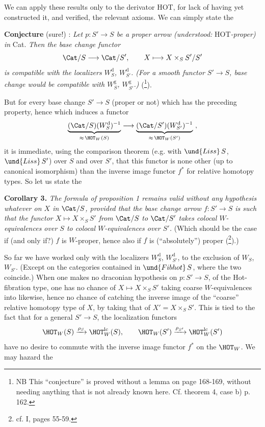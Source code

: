 We can apply these results only to the derivator
HOT, for lack of having yet constructed it, and verified, the relevant axioms. We can simply state %
the

\textbf{Conjecture} (sure!) : \textit{Let $p : S' \longrightarrow S$ be a proper arrow (understood:} HOT\textit{-proper) in} Cat. \textit{Then the base change functor}
\[
\Cat/S \longrightarrow \Cat/S', \qquad X \longmapsto X \times_S S'/S'
\]
\textit{is compatible with the localizers $W_S^{\mathrm{d}}$, $W_{S'}^{\mathrm{d}}$. (For a smooth functor $S' \longrightarrow S$, base change would be compatible with $W_S^{\mathrm{g}}$, $W_{S'}^{\mathrm{g}}$.)} (\footnote[61]{NB This ``conjecture'' is proved without a lemma on page 168-169, without needing anything that is not %
already known here. Cf. theorem 4, case b) p. 162.}).

But for every base change $S' \longrightarrow S$ (proper or not) which has the preceding property, %
hence which induces a functor
\[
\underbrace{(\Cat/S)(W_S^{\mathrm{d}})^{-1}}_{\approx\,\HOT_W(S)} \longrightarrow \underbrace{(\Cat/S')(W_{S'}^{\mathrm{d}})^{-1}}_{\approx\,\HOT_W(S')}\ ,
\]
it is immediate, using the comparison theorem (e.g. with $\und{Liss}\,S$, $\und{Liss}\,S'$) over $S$ and over $S'$, that this functor is none other (up to canonical isomorphism) than the inverse image functor $f^*$ for relative homotopy types. So let us state the %

\textbf{Corollary 3.} \textit{The formula of proposition 1 remains valid without any hypothesis whatever on $X$ in} $\Cat/S$\textit{, provided that the base change arrow $f : S' \longrightarrow S$ is such that the functor $X \longmapsto X \times_S S'$ from} $\Cat/S$ \textit{to} $\Cat/S'$
\textit{takes colocal $W$-equivalences over $S$ to colocal $W$-equivalences over $S'$.} (Which should be the case if (and only if?) $f$ is $W$-proper, hence also if $f$ is (``absolutely'') proper (\footnote[62]{cf. I, pages 55-59.}).)

So far we have worked only with the localizers $W_S^{\mathrm{d}}$, $W_{S'}^{\mathrm{d}}$, to the exclusion of $W_S$, $W_{S'}$. (Except on the categories contained in $\und{Fibhot}\,S$, where the two coincide.) When one makes no draconian hypothesis on $p : S' \longrightarrow S$, of the Hot-fibration type, one has no chance of $X \longmapsto X \times_S S'$ taking coarse $W$-equivalences into likewise, hence no chance of catching the inverse image of the ``coarse'' relative homotopy type of $X$, by taking that of $X' = X \times_S S'$. This is tied to the fact that for a general $S' \longrightarrow S$, the localization functors
\[
\HOT_W(S) \xrightarrow{\rho_S} \HOT_W^{\mathrm{lc}}(S), \qquad \HOT_W(S') \xrightarrow{\rho_{S'}} \HOT_W^{\mathrm{lc}}(S')
\]
have no desire to commute with the inverse image functor $f^*$ on the $\HOT_W$. We may hazard the

